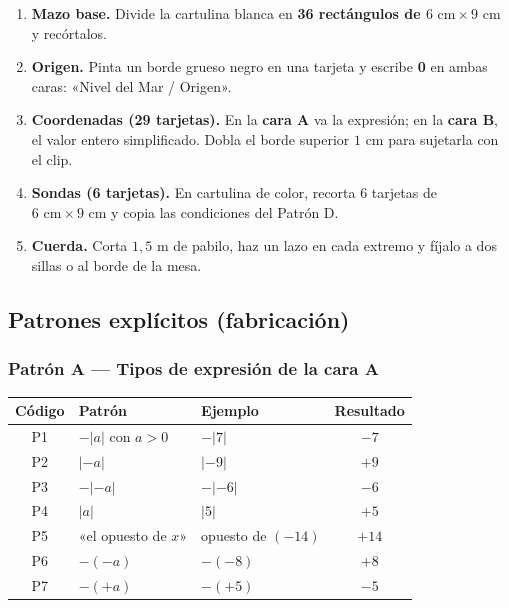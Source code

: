 \documentclass[12pt, letterpaper]{article}
\newcommand{\abs}[1]{\lvert #1\rvert}
\begin{document}
\begin{enumerate}[leftmargin=*]
  \item \textbf{Mazo base.} Divide la cartulina blanca en \textbf{36 rectángulos de $6\text{ cm}\times 9\text{ cm}$} y recórtalos.
  \item \textbf{Origen.} Pinta un borde grueso negro en una tarjeta y escribe \textbf{0} en ambas caras: «Nivel del Mar / Origen».
  \item \textbf{Coordenadas (29 tarjetas).} En la \textbf{cara A} va la expresión; en la \textbf{cara B}, el valor entero simplificado. Dobla el borde superior $1$ cm para sujetarla con el clip.
  \item \textbf{Sondas (6 tarjetas).} En cartulina de color, recorta 6 tarjetas de $6\text{ cm}\times 9\text{ cm}$ y copia las condiciones del Patrón D.
  \item \textbf{Cuerda.} Corta $1{,}5$ m de pabilo, haz un lazo en cada extremo y fíjalo a dos sillas o al borde de la mesa.
\end{enumerate}

\subsection{Patrones explícitos (fabricación)}

\subsubsection{Patrón A — Tipos de expresión de la cara A}

\begin{center}
\small
\begin{tabular}{@{}c l l c@{}}
\toprule
\textbf{Código} & \textbf{Patrón} & \textbf{Ejemplo} & \textbf{Resultado}\\
\midrule
P1 & $-\abs{a}$ con $a>0$ & $-\abs{7}$ & $-7$\\
P2 & $\abs{-a}$ & $\abs{-9}$ & $+9$\\
P3 & $-\abs{-a}$ & $-\abs{-6}$ & $-6$\\
P4 & $\abs{a}$ & $\abs{5}$ & $+5$\\
P5 & «el opuesto de $x$» & opuesto de $(-14)$ & $+14$\\
P6 & $-(-a)$ & $-(-8)$ & $+8$\\
P7 & $-(+a)$ & $-(+5)$ & $-5$\\
\bottomrule
\end{tabular}
\end{center}
\end{document}
